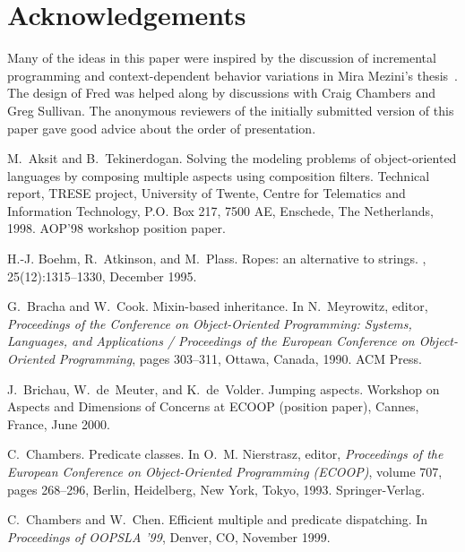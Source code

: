 \documentclass{acm_proc_article-sp}
\begin{document}
\section{Acknowledgements}
\label{section:ack}

Many of the ideas in this paper were inspired by the discussion of
incremental programming and context-dependent behavior variations in
Mira Mezini's thesis~\cite{mezini-thesis}.  The design of Fred was
helped along by discussions with Craig Chambers and Greg Sullivan.
The anonymous reviewers of the initially submitted version of this
paper gave good advice about the order of presentation.


%
\begin{thebibliography}{10}

M.~Aksit and B.~Tekinerdogan.
\newblock Solving the modeling problems of object-oriented languages by
  composing multiple aspects using composition filters.
\newblock Technical report, TRESE project, University of Twente, Centre for
  Telematics and Information Technology, P.O. Box 217, 7500 AE, Enschede, The
  Netherlands, 1998.
\newblock AOP'98 workshop position paper.

H.-J. Boehm, R.~Atkinson, and M.~Plass.
\newblock Ropes: an alternative to strings.
, 25(12):1315--1330, December
  1995.

G.~Bracha and W.~Cook.
\newblock Mixin-based inheritance.
\newblock In N.~Meyrowitz, editor, {\em Proceedings of the Conference on
  Object-Oriented Programming: Systems, Languages, and Applications /
  Proceedings of the European Conference on Object-Oriented Programming}, pages
  303--311, Ottawa, Canada, 1990. ACM Press.

J.~Brichau, W.~de~Meuter, and K.~de~Volder.
\newblock Jumping aspects.
\newblock Workshop on Aspects and Dimensions of Concerns at ECOOP (position
  paper), Cannes, France, June 2000.

C.~Chambers.
\newblock Predicate classes.
\newblock In O.~M. Nierstrasz, editor, {\em Proceedings of the European
  Conference on Object-Oriented Programming ({ECOOP})}, volume 707, pages
  268--296, Berlin, Heidelberg, New York, Tokyo, 1993. Springer-Verlag.

C.~Chambers and W.~Chen.
\newblock Efficient multiple and predicate dispatching.
\newblock In {\em Proceedings of OOPSLA '99}, Denver, CO, November 1999.


\end{thebibliography}
\end{document}
